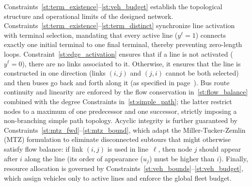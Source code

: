 \documentclass[a4paper,fleqn]{cas-sc}
\begin{document}
%
Constraints~\eqref{st:term_existence}--\eqref{st:veh_budget} establish the topological structure and operational limits of the designed network. 
%
Constraints~\eqref{st:term_existence}--\eqref{st:term_distinct} synchronize line activation with terminal selection, mandating that every active line ($y^\ell=1$) connects exactly one initial terminal to one final terminal, thereby preventing zero-length loops. 
%
Constraint~\eqref{st:edge_activation} ensures that if a line is not activated ($y^\ell=0$), there are no links associated to it. Otherwise, it ensures that the line is constructed in one direction (links $(i,j)$ and $(j,i)$ cannot be both selected) and then buses go back and forth along it (as specified in page~\pageref{sentence:line-in-one-direction}).
%
%
%
Bus route continuity and linearity are enforced by the flow conservation in~\eqref{st:flow_balance} combined with the degree Constraints in~\eqref{st:simple_path}; the latter restrict nodes to a maximum of one predecessor and one successor, strictly imposing a non-branching simple path topology. 
%
Acyclic integrity is further guaranteed by Constraints~\eqref{st:mtz_fwd}--\eqref{st:mtz_bound}, which adapt the Miller-Tucker-Zemlin (MTZ) formulation to eliminate disconnected subtours that might otherwise satisfy flow balance: if link $(i,j)$ is used in line~$\ell$, then node $j$ should appear after $i$ along the line (its order of appearance ($u_j$) must be higher than $i$).
%
Finally, resource allocation is governed by Constraints~\eqref{st:veh_bounds}--\eqref{st:veh_budget}, which assign vehicles only to active lines and enforce the global fleet budget.
%
\end{document}
